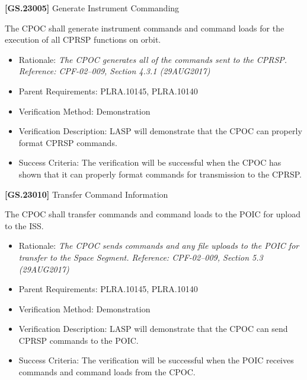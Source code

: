 \documentclass[12pt,oneside,oldfontcommands]{memoir}
\begin{document}
\label{tbx_1}

\textbf{[GS.23005]} Generate Instrument Commanding

The \gls{CPOC} shall generate instrument commands and command loads for the execution of all \gls{CPRSP} functions on orbit.

\begin{itemize}
\item{} Rationale: \emph{The CPOC generates all of the commands sent to the CPRSP. Reference: CPF-02--009, Section 4.3.1 (29AUG2017)}

\item{} Parent Requirements: PLRA.10145, PLRA.10140

\item{} Verification Method: Demonstration

\item{} Verification Description: \gls{LASP} will demonstrate that the \gls{CPOC} can properly format \gls{CPRSP} commands.

\item{} Success Criteria: The verification will be successful when the \gls{CPOC} has shown that it can properly format commands for transmission to the \gls{CPRSP}.

\end{itemize}

\textbf{[GS.23010]} Transfer Command Information

The \gls{CPOC} shall transfer commands and command loads to the \gls{POIC} for upload to the \gls{ISS}.

\begin{itemize}
\item{} Rationale: \emph{The CPOC sends commands and any file uploads to the POIC for transfer to the Space Segment. Reference: CPF-02--009, Section 5.3 (29AUG2017)}

\item{} Parent Requirements: PLRA.10145, PLRA.10140

\item{} Verification Method: Demonstration

\item{} Verification Description: \gls{LASP} will demonstrate that the \gls{CPOC} can send \gls{CPRSP} commands to the \gls{POIC}.

\item{} Success Criteria: The verification will be successful when the \gls{POIC} receives commands and command loads from the \gls{CPOC}.

\end{itemize}
\end{document}
